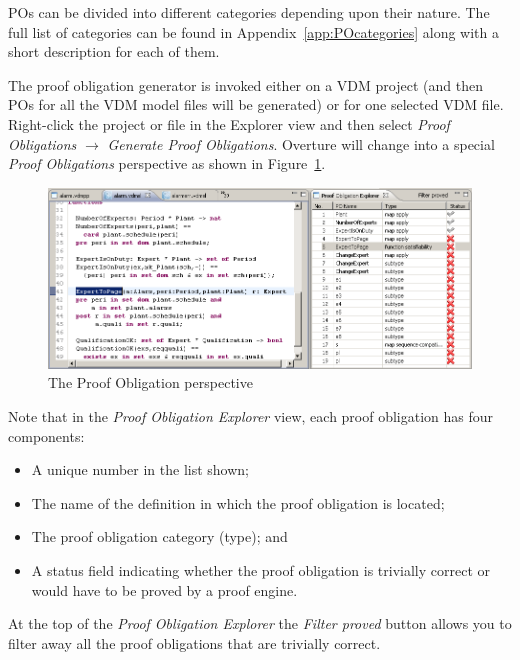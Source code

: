 \documentclass{overturerepchap}
\begin{document}
POs can be divided into different categories
depending upon their nature. The full list of categories can be found in
Appendix~\ref{app:POcategories} along with a short description for
each of them.

The proof obligation generator is invoked either on a VDM project (and
then POs for all the VDM model files will be generated) or for one
selected VDM file. Right-click the project or file in the Explorer view and
then select \emph{Proof Obligations} $\rightarrow$ \emph{Generate Proof
  Obligations}. Overture will change into a special
\emph{Proof Obligations} perspective as shown in
Figure~\ref{fig:POview}.  

\begin{figure}[htbp]
\begin{center}
\includegraphics[width=\textwidth]{figures/POview}
\caption{The Proof Obligation perspective\label{fig:POview}}
\end{center}
\end{figure}

Note that in the \emph{Proof Obligation Explorer} view, each proof
obligation has four components:
\begin{itemize}
\item A unique number in the list shown;
\item The name of the definition in which the proof obligation is
  located;
\item The proof obligation category (type); and
\item A status field indicating whether the proof obligation is
  trivially correct or would have to be proved by a proof engine.
\end{itemize}

At the top of the \emph{Proof Obligation Explorer} the \emph{Filter proved} button
allows you to filter away all the proof obligations that are trivially
correct. 
\end{document}

